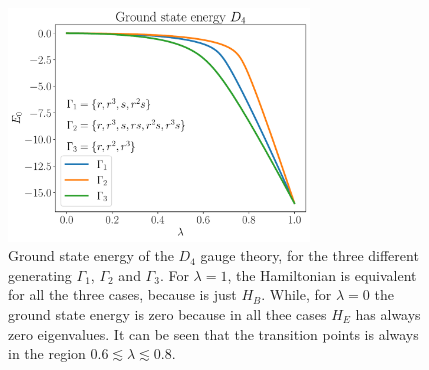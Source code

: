 \newpage

\vspace*{1cm}

\begin{figure}[h]
    \centering
    \includegraphics[width=8cm]{assets/graphs/gs_energy_comparison_1_2_3.pdf}
    \caption[Ground state energy for $D_4$]{Ground state energy of the $D_4$ gauge theory, for the three different generating $\Gamma_1$, $\Gamma_2$ and $\Gamma_3$.
        For $\lambda=1$, the Hamiltonian is equivalent for all the three cases, because is just $H_B$.
        While, for $\lambda=0$ the ground state energy is zero because in all thee cases $H_E$ has always zero eigenvalues.
        It can be seen that the transition points is always in the region $ 0.6 \lesssim \lambda \lesssim 0.8$.
    }%
    \label{fig:ground_state_energy_D4}
\end{figure}

\vspace*{0.5cm}

